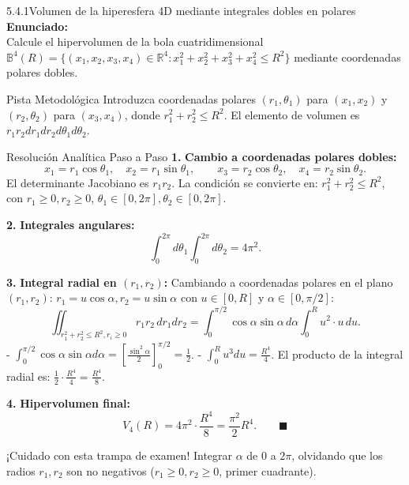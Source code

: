 \documentclass[11pt,a4paper]{article}
\begin{document}
\begin{nivelbox}{5.4.1}{Volumen de la hiperesfera 4D mediante integrales dobles en polares}
\textbf{Enunciado:}\\
Calcule el hipervolumen de la bola cuatridimensional $\mathbb{B}^4(R) = \{ (x_1, x_2, x_3, x_4) \in \mathbb{R}^4 : x_1^2 + x_2^2 + x_3^2 + x_4^2 \le R^2 \}$ mediante coordenadas polares dobles.

\begin{observacionbox}{Pista Metodológica}
Introduzca coordenadas polares $(r_1, \theta_1)$ para $(x_1, x_2)$ y $(r_2, \theta_2)$ para $(x_3, x_4)$, donde $r_1^2 + r_2^2 \le R^2$. El elemento de volumen es $r_1 r_2 dr_1 dr_2 d\theta_1 d\theta_2$.
\end{observacionbox}

\begin{ejerciciobox}{Resolución Analítica Paso a Paso}
\smallskip\noindent\textbf{1.} \textbf{Cambio a coordenadas polares dobles:}
\[x_1 = r_1\cos\theta_1, \quad x_2 = r_1\sin\theta_1, \qquad x_3 = r_2\cos\theta_2, \quad x_4 = r_2\sin\theta_2.\]
El determinante Jacobiano es $r_1 r_2$.
La condición se convierte en: $r_1^2 + r_2^2 \le R^2$, con $r_1 \ge 0, r_2 \ge 0$, $\theta_1 \in [0, 2\pi], \theta_2 \in [0, 2\pi]$.

\smallskip\noindent\textbf{2.} \textbf{Integrales angulares:}
\[\int_0^{2\pi} d\theta_1 \int_0^{2\pi} d\theta_2 = 4\pi^2.\]

\smallskip\noindent\textbf{3.} \textbf{Integral radial en $(r_1, r_2)$:}
Cambiando a coordenadas polares en el plano $(r_1, r_2)$: $r_1 = u\cos\alpha, r_2 = u\sin\alpha$ con $u \in [0, R]$ y $\alpha \in [0, \pi/2]$:
\[\iint_{r_1^2+r_2^2 \le R^2, r_i \ge 0} r_1 r_2 \, dr_1 dr_2 = \int_0^{\pi/2} \cos\alpha\sin\alpha \, d\alpha \int_0^R u^2 \cdot u \, du.\]
- $\int_0^{\pi/2} \cos\alpha\sin\alpha d\alpha = \left[ \frac{\sin^2\alpha}{2} \right]_0^{\pi/2} = \frac{1}{2}$.
- $\int_0^R u^3 du = \frac{R^4}{4}$.
El producto de la integral radial es: $\frac{1}{2} \cdot \frac{R^4}{4} = \frac{R^4}{8}$.

\smallskip\noindent\textbf{4.} \textbf{Hipervolumen final:}
\[V_4(R) = 4\pi^2 \cdot \frac{R^4}{8} = \frac{\pi^2}{2} R^4. \qquad \blacksquare\]
\end{ejerciciobox}

\begin{errorbox}{¡Cuidado con esta trampa de examen!}
Integrar $\alpha$ de $0$ a $2\pi$, olvidando que los radios $r_1, r_2$ son no negativos ($r_1 \ge 0, r_2 \ge 0$, primer cuadrante).
\end{errorbox}
\end{nivelbox}
\bigskip
\end{document}
